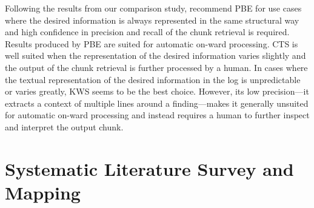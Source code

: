 

Following the results from our comparison study,
recommend PBE for use cases where the desired information is always
represented in the same structural way and high confidence in precision
and recall of the chunk retrieval is required.
Results produced by PBE are suited for automatic on-ward processing.
CTS is well suited when the representation of the desired information
varies
slightly and the output of the chunk retrieval is further processed by
a human.
In cases where the textual representation of the desired information in
the log
is unpredictable or varies greatly, KWS seems to be the best choice.
However,
its low precision---it extracts a context of multiple lines around a
finding---makes it generally unsuited for automatic on-ward processing and
instead requires a human to further inspect and interpret the output
chunk.

\section{Systematic Literature Survey and Mapping}
\label{sec:survey}

